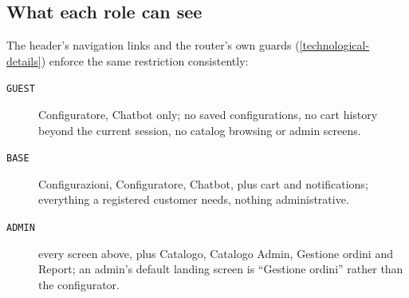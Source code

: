 \subsection{What each role can see}\label{ug-roles}

The header's navigation links and the router's own guards
(\cref{technological-details}) enforce the same restriction consistently:

\begin{description}
  \item[\texttt{GUEST}] Configuratore, Chatbot only; no saved
  configurations, no cart history beyond the current session, no catalog
  browsing or admin screens.
  \item[\texttt{BASE}] Configurazioni, Configuratore, Chatbot, plus cart and
  notifications; everything a registered customer needs, nothing
  administrative.
  \item[\texttt{ADMIN}] every screen above, plus Catalogo, Catalogo Admin,
  Gestione ordini and Report; an admin's default landing screen is
  ``Gestione ordini'' rather than the configurator.
\end{description}
